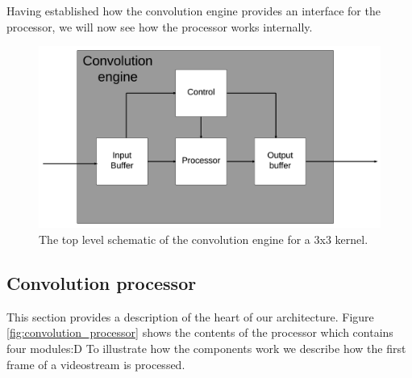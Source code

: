 Having established how the convolution engine provides an interface for the processor, we will now see how the processor works internally.

\begin{figure}[h!]
    \includegraphics[width=\linewidth]{img/convolution_engine.png}
    \caption{The top level schematic of the convolution engine for a 3x3 kernel.}
    \label{fig:conv_engine}
\end{figure}

\subsection{Convolution processor}
This section provides a description of the heart of our architecture.
Figure \ref{fig:convolution_processor} shows the contents of the processor which contains four modules:D
To illustrate how the components work we describe how the first frame of a videostream is processed.


